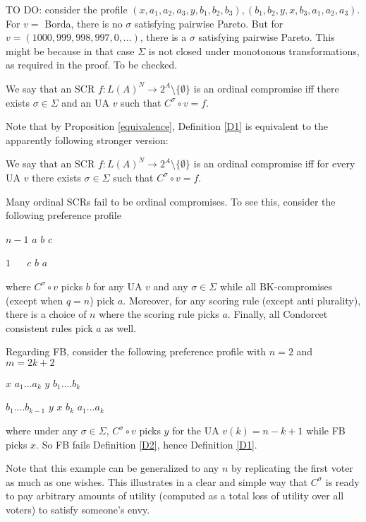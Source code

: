 \documentclass[version=3.21, pagesize, notitlepage, twoside=off, bibliography=totoc, DIV=calc, fontsize=12pt, a4paper]{scrartcl}
\begin{document}
TO DO: consider the profile $(x, a_1, a_2, a_3, y, b_1, b_2, b_3), (b_1, b_2, y, x, b_3, a_1, a_2, a_3)$. For $v = $ Borda, there is no $\sigma$ satisfying pairwise Pareto. But for $v = (1000, 999, 998, 997, 0, …)$, there is a $\sigma$ satisfying pairwise Pareto. This might be because in that case $\Sigma$ is not closed under monotonous transformations, as required in the proof. To be checked.

\begin{definition}
\label{D1} \bigskip We say that an SCR $f:L(A)^{N}\rightarrow 2^{A} \setminus \{\emptyset \}$ is an ordinal compromise iff there exists $\sigma \in \Sigma $ and an UA $v$ such that $C^{\sigma }\circ v=f$.
\end{definition}

Note that by Proposition \ref{equivalence}, Definition \ref{D1} is equivalent to the apparently following stronger version:

\begin{definition}
\label{D2} We say that an SCR $f:L(A)^{N}\rightarrow 2^{A} \setminus \{\emptyset \}$ is an ordinal compromise iff for every UA $v$ there exists $\sigma \in \Sigma $ such that $C^{\sigma }\circ v=f$.
\end{definition}

Many ordinal SCRs fail to be ordinal compromises. To see this, consider the following preference profile

$n-1$ $a$ $b$ $c$

$1$ $\ \ \ \ \ \ c$ $b$ $a$

where $C^{\sigma }\circ v$ picks $b$ for any UA $v$ and any $\sigma \in \Sigma $ while all BK-compromises (except when $q=n$) pick $a$. Moreover, for any scoring rule (except anti plurality), there is a choice of $n$ where the scoring rule picks $a$. Finally, all Condorcet consistent rules pick $a$ as well.

Regarding FB, consider the following preference profile with $n=2$ and $m=2k+2$

\bigskip

$x$ $a_{1}...a_{k}$ $y$ $b_{1}....b_{k}$

$b_{1}....b_{k-1}$ $y$ $x$ $b_{k}$ $a_{1}...a_{k}$

\bigskip

where under any $\sigma \in \Sigma $, $C^{\sigma }\circ v$ picks $y$ for the UA $v(k)=n-k+1$ while FB picks $x$. So FB fails Definition \ref{D2}, hence Definition \ref{D1}.

Note that this example can be generalized to any $n$ by replicating the first voter as much as one wishes. This illustrates in a clear and simple
way that $C^{\sigma }$ is ready to pay arbitrary amounts of utility (computed as a total loss of utility over all voters) to satisfy someone's envy.
\end{document}
